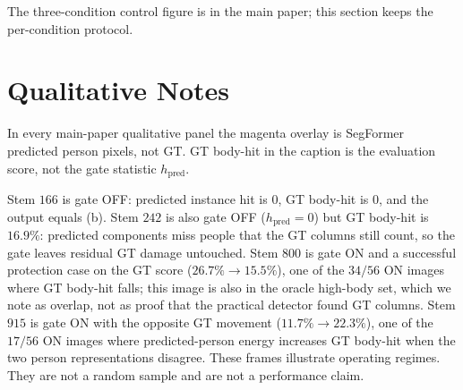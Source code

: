 \documentclass[conference,a4paper]{IEEEtran}
\begin{document}
The three-condition control figure is in the main paper; this
section keeps the per-condition protocol.

\section{Qualitative Notes}
\label{sec:supp-qual}

In every main-paper qualitative panel the magenta overlay is
SegFormer predicted person pixels, not GT. GT body-hit in the
caption is the evaluation score, not the gate statistic
$h_{\mathrm{pred}}$.

Stem $166$ is gate OFF: predicted instance hit is $0$, GT
body-hit is $0$, and the output equals (b). Stem $242$ is also
gate OFF ($h_{\mathrm{pred}}=0$) but GT body-hit is $16.9\%$:
predicted components miss people that the GT columns still
count, so the gate leaves residual GT damage untouched. Stem
$800$ is gate ON and a successful protection case on the GT
score ($26.7\%\rightarrow 15.5\%$), one of the $34/56$ ON images
where GT body-hit falls; this image is also in the oracle
high-body set, which we note as overlap, not as proof that the
practical detector found GT columns. Stem $915$ is gate ON with
the opposite GT movement ($11.7\%\rightarrow 22.3\%$), one of
the $17/56$ ON images where predicted-person energy increases GT
body-hit when the two person representations disagree. These
frames illustrate operating regimes. They are not a random
sample and are not a performance claim.



\end{document}
